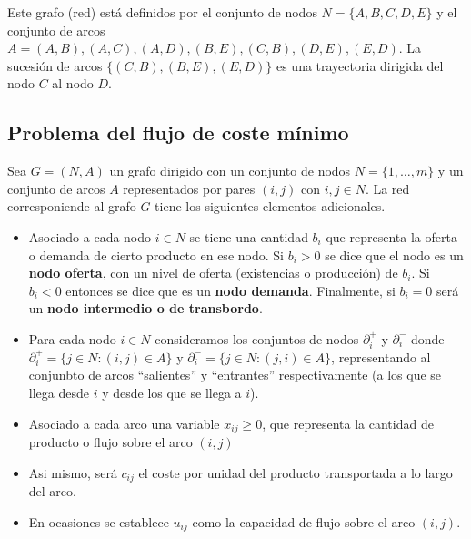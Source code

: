 \begin{center}
\end{center}

Este grafo (red) está definidos por el conjunto de nodos $N=\{A,B,C,D,E\}$ y el conjunto de arcos 
$A={(A,B),(A,C),(A,D),(B,E),(C,B),(D,E),(E,D)}$. La sucesión de arcos $\{(C,B),(B,E),(E,D)\}$ es una trayectoria dirigida del
nodo $C$ al nodo $D$.

\newpage

\subsection{Problema del flujo de coste mínimo}

Sea $G=(N,A)$ un grafo dirigido con un conjunto de nodos $N=\{1,\dots,m\}$ y un conjunto de arcos $A$ representados por pares
$(i,j)$ con $i,j\in N$. La red corresponiende al grafo $G$ tiene los siguientes elementos adicionales.

\begin{itemize}
    \item Asociado a cada nodo $i\in N$ se tiene una cantidad $b_i$ que representa la oferta o demanda de cierto producto
          en ese nodo. Si $b_i>0$ se dice que el nodo es un \textbf{nodo oferta}, con un nivel de oferta (existencias o 
          producción) de $b_i$. Si $b_i<0$ entonces se dice que es un \textbf{nodo demanda}. Finalmente, si $b_i=0$ será
          un \textbf{nodo intermedio o de transbordo}.
    \item Para cada nodo $i\in N$ consideramos los conjuntos de nodos $\partial_i^+$ y $\partial_i^-$ donde 
          $\partial_i^+=\{j\in N:(i,j)\in A\}$ y $\partial_i^-=\{j\in N:(j,i)\in A\}$, representando al conjunbto de arcos
          ``salientes'' y ``entrantes'' respectivamente (a los que se llega desde $i$ y desde los que se llega a $i$).
    \item Asociado a cada arco una variable $x_{ij}\geq0$, que representa la cantidad de producto o flujo sobre el arco $(i,j)$
    \item Asi mismo, será $c_{ij}$ el coste por unidad del producto transportada a lo largo del arco.
    \item En ocasiones se establece $u_{ij}$ como la capacidad de flujo sobre el arco $(i,j)$.
\end{itemize}

